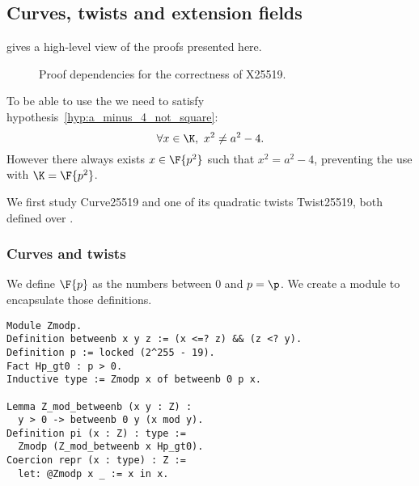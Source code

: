 \subsection{Curves, twists and extension fields}
\label{subsec:curve_twist_fields}

 gives a high-level view of the proofs presented here.

\begin{figure}[h]
  \centering
  
  \caption{Proof dependencies for the correctness of X25519.}
  \label{tikz:ProofHighLevel2}
\end{figure}

To be able to use the  we need to satisfy
hypothesis~\ref{hyp:a_minus_4_not_square}:%
$$\forall x \in \K,\ x^2 \neq a^2-4.$$
However there always exists $x \in \F{p^2}$ such that $x^2 = a^2-4$,
preventing the use 
with $\K = \F{p^2}$.

\begin{sloppypar}
We first study Curve25519 and one of its quadratic twists Twist25519,
both defined over .
\end{sloppypar}

\subsubsection{Curves and twists}
\label{subsec:Zmodp}

We define $\F{p}$ as the numbers between $0$ and $p = \p$.
We create a  module to encapsulate those definitions.
\begin{lstlisting}[language=Coq]
Module Zmodp.
Definition betweenb x y z := (x <=? z) && (z <? y).
Definition p := locked (2^255 - 19).
Fact Hp_gt0 : p > 0.
Inductive type := Zmodp x of betweenb 0 p x.

Lemma Z_mod_betweenb (x y : Z) :
  y > 0 -> betweenb 0 y (x mod y).
Definition pi (x : Z) : type :=
  Zmodp (Z_mod_betweenb x Hp_gt0).
Coercion repr (x : type) : Z :=
  let: @Zmodp x _ := x in x.
\end{lstlisting}


